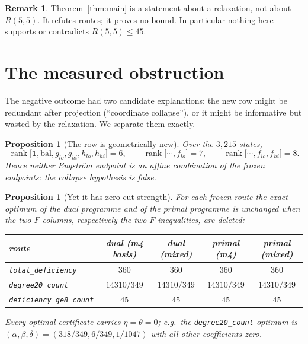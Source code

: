 \documentclass[11pt]{article}
\newtheorem{proposition}[theorem]{Proposition}
\theoremstyle{definition}
\newtheorem{remark}[theorem]{Remark}
\DeclareMathOperator{\rank}{rank}
\newcommand{\Rams}{R}
\begin{document}
\begin{remark}
Theorem~\ref{thm:main} is a statement about a relaxation, not about
$\Rams(5,5)$. It refutes routes; it proves no bound. In particular nothing here
supports or contradicts $\Rams(5,5)\le45$.
\end{remark}

\section{The measured obstruction}

The negative outcome had two candidate explanations: the new row might be
redundant after projection (``coordinate collapse''), or it might be
informative but wasted by the relaxation. We separate them exactly.

\begin{proposition}[The row is geometrically new]\label{prop:rank}
Over the $3{,}215$ states,
\[
\rank\big[\mathbf 1,\mathrm{bal},g_{lo},g_{hi},h_{lo},h_{hi}\big]=6,\qquad
\rank\big[\cdots,f_{lo}\big]=7,\qquad
\rank\big[\cdots,f_{lo},f_{hi}\big]=8 .
\]
Hence neither Engstr\"om endpoint is an affine combination of the frozen
endpoints: the collapse hypothesis is false.
\end{proposition}

\begin{proposition}[Yet it has zero cut strength]\label{prop:strength}
For each frozen route the exact optimum of the dual programme and of the primal
programme is unchanged when the two $F$ columns, respectively the two $F$
inequalities, are deleted:
\begin{center}
\begin{tabular}{lcccc}
\toprule
route & dual (m4 basis) & dual (mixed) & primal (m4) & primal (mixed)\\
\midrule
\texttt{total\_deficiency} & $360$ & $360$ & $360$ & $360$\\
\texttt{degree20\_count} & $14310/349$ & $14310/349$ & $14310/349$ & $14310/349$\\
\texttt{deficiency\_ge8\_count} & $45$ & $45$ & $45$ & $45$\\
\bottomrule
\end{tabular}
\end{center}
Every optimal certificate carries $\eta=\theta=0$; e.g.\ the
\texttt{degree20\_count} optimum is $(\alpha,\beta,\delta)=(318/349,6/349,1/1047)$
with all other coefficients zero.
\end{proposition}
\end{document}
